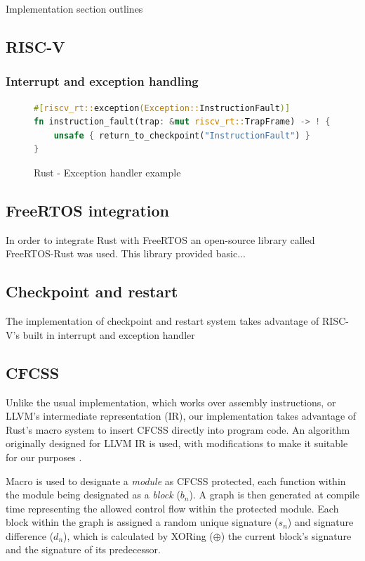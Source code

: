 \documentclass[12pt, letterpaper]{article}
\begin{document}
Implementation section outlines 

\subsection{RISC-V}

\subsubsection{Interrupt and exception handling}

\begin{figure}
\begin{lstlisting}[language=Rust]
#[riscv_rt::exception(Exception::InstructionFault)]
fn instruction_fault(trap: &mut riscv_rt::TrapFrame) -> ! {
    unsafe { return_to_checkpoint("InstructionFault") }
}
\end{lstlisting}
\caption{Rust - Exception handler example}
\label{fig:rust_exception_handler}
\end{figure}

\subsection{FreeRTOS integration}

In order to integrate Rust with FreeRTOS an open-source library called FreeRTOS-Rust was used. This library provided basic... 

\subsection{Checkpoint and restart}

The implementation of checkpoint and restart system takes advantage of RISC-V's built in interrupt and exception handler

\newpage
\subsection{CFCSS}

Unlike the usual implementation, which works over assembly instructions, or LLVM's intermediate representation (IR), our implementation takes advantage of Rust's macro system to insert CFCSS directly into program code. An algorithm originally designed for LLVM IR is used, with modifications to make it suitable for our purposes \cite{coast:cfcss}.

Macro is used to designate a \textit{module} as CFCSS protected, each function within the module being designated as a \textit{block} ({$b_n$}). A graph is then generated at compile time representing the allowed control flow within the protected module. Each block within the graph is assigned a random unique signature ({$s_n$}) and signature difference ({$d_n$}), which is calculated by XORing ({$\oplus$}) the current block's signature and the signature of its predecessor.
\end{document}
